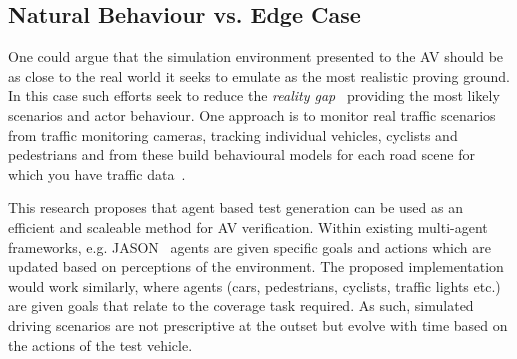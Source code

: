 \documentclass[letterpaper, 10 pt, journal, twoside]{IEEEtran}
\begin{document}


\subsection{Natural Behaviour vs. Edge Case}
One could argue that the simulation environment presented to the AV should be as close to the real world it seeks to emulate as the most realistic proving ground. In this case such efforts seek to reduce the \textit{reality gap}~\cite{Jakobi1995} providing the most likely scenarios and actor behaviour. One approach is to monitor real traffic scenarios from traffic monitoring cameras, tracking individual vehicles, cyclists and pedestrians and from these build behavioural models for each road scene for which you have traffic data~\cite{latentlogic waiting for email reply}. 


This research proposes that agent based test generation can be used as an efficient and scaleable method for AV verification. Within existing multi-agent frameworks, e.g. JASON~\cite{bordini2005jason} agents are given specific goals and actions which are updated based on perceptions of the environment. The proposed implementation would work similarly, where agents (cars, pedestrians, cyclists, traffic lights etc.) are given goals that relate to the coverage task required. As such, simulated driving scenarios are not prescriptive at the outset but evolve with time based on the actions of the test vehicle.




\end{document}
